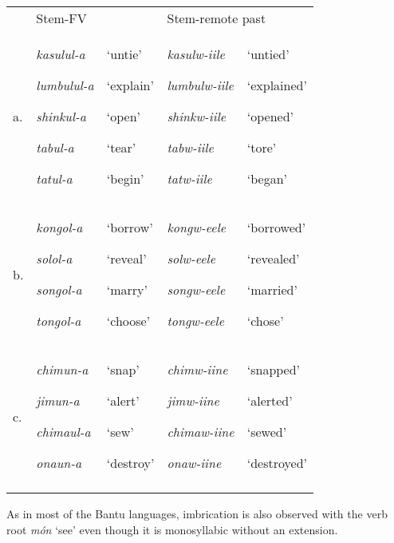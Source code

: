 \documentclass[output=paper]{langsci/langscibook}
\begin{document}
\begin{tabularx}{\textwidth}{XXXXX} & \multicolumn{2}{l}{Stem-FV} & \multicolumn{2}{l}{Stem-remote past}\\
\lsptoprule
a. & {\emph{kasulul-a}}

{\emph{lumbulul-a}}

{\emph{shinkul-a}}

{\emph{tabul-a}}

\emph{tatul-a} & {‘untie’}

{‘explain’}

{‘open’}

{‘tear’}

‘begin’ & {\emph{kasulw-iile}}

{\emph{lumbulw-iile}}

{\emph{shinkw-iile}}

{\emph{tabw-iile}}

\emph{tatw-iile} & {‘untied’}

{‘explained’}

{‘opened’}

{‘tore’}

‘began’\\
b. & {\emph{kongol-a}}

{\emph{solol-a}}

{\emph{songol-a}}

\emph{tongol-a} & {‘borrow’}

{‘reveal’}

{‘marry’}

‘choose’ & {\emph{kongw-eele}}

{\emph{solw-eele}}

{\emph{songw-eele}}

\emph{tongw-eele} & {‘borrowed’}

{‘revealed’}

{‘married’}

‘chose’\\
c. & {\emph{chimun-a}}

{\emph{jimun-a}}

{\emph{chimaul-a}}

\emph{onaun-a} & {‘snap’}

{‘alert’}

{‘sew’}

‘destroy’ & {\emph{chimw-iine}}

{\emph{jimw-iine}}

{\emph{chimaw-iine}}

\emph{onaw-iine} & {‘snapped’}

{‘alerted’}

{‘sewed’}

‘destroyed’\\
\lspbottomrule
\end{tabularx}
As in most of the Bantu languages, imbrication is also observed with the verb root \emph{món} ‘see’ even though it is monosyllabic without an extension. 
\end{document}
